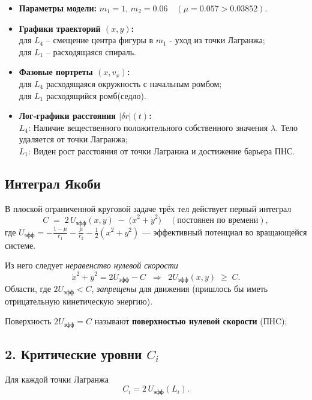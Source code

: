 \documentclass[12pt]{article}
\begin{document}
\begin{itemize}
  \item \textbf{Параметры модели:} $m_1=1$, $m_2=0.06\quad(\mu=0.057>0.03852)$.
  \item \textbf{Графики траекторий $(x,y)$:}\\
        для $L_4$ -- смещение центра фигуры в $m_1$ - уход из точки Лагранжа;\\
        для $L_1$ -- расходящаяся спираль. 
  \item \textbf{Фазовые портреты $(x,v_x)$:}\\
        для $L_4$ расходящаяся окружность с начальным ромбом;\\
        для $L_1$ расходящийся ромб(седло).
  \item \textbf{Лог‑графики расстояния $|\delta r|(t)$:}\\
        $L_4$:  Наличие вещественного положительного собственного значения $\lambda$. Тело удаляется от точки Лагранжа;\\
        $L_1$: Виден рост расстояния от точки Лагранжа и достижение барьера ПНС.
\end{itemize}



\subsection{Интеграл Якоби}

В плоской ограниченной круговой задаче трёх тел действует первый интеграл
\[
C \;=\; 2\,U_{\mathrm{эфф}}(x,y)\;-\;\bigl(\dot x^{2}+\dot y^{2}\bigr)
\quad(\text{постоянен по времени}),
\]
где
\(
U_{\mathrm{эфф}} = -\frac{1-\mu}{r_1}-\frac{\mu}{r_2}-\tfrac12(x^{2}+y^{2})
\)
— эффективный потенциал во вращающейся системе.

Из него следует \emph{неравенство нулевой скорости}
\[
\dot x^{2}+\dot y^{2}=2U_{\mathrm{эфф}}-C \;\;\Longrightarrow\;\;
2U_{\mathrm{эфф}}(x,y)\;\ge\;C .
\]
Области, где $2U_{\mathrm{эфф}}<C$, \emph{запрещены} для движения
(пришлось бы иметь отрицательную кинетическую энергию).

Поверхность $2U_{\mathrm{эфф}}=C$ называют \textbf{поверхностью нулевой скорости} (ПНC);

\subsection*{2. Критические уровни $C_i$}

Для каждой точки Лагранжа
\[
C_i = 2\,U_{\mathrm{эфф}}(L_i).
\]
\end{document}
